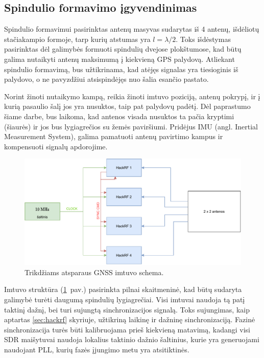 \documentclass[main.tex]{subfiles}
\begin{document}
\subsection{Spindulio formavimo įgyvendinimas}\label{sec:beamforming_concept}

Spindulio formavimui pasirinktas antenų masyvas sudarytas iš 4 antenų, išdėliotų
sta\-čia\-kam\-pio formoje, tarp kurių atstumas yra $l=\lambda / 2$. Toks
išdėstymas pasirinktas dėl galimybės formuoti spindulių dvejose plokštumose,
kad būtų galima nutaikyti antenų maksimumą į kiekvieną GPS palydovą.
Atliekant spindulio formavimą, bus užtikrinama, kad atėjęs signalas yra
tiesioginis iš palydovo, o ne pavyzdžiui atsispindėjęs nuo šalia esančio pastato.

Norint žinoti nutaikymo kampą, reikia žinoti imtuvo poziciją, antenų pokrypį,
ir į kurią pasaulio šalį jos yra nusuktos, taip pat palydovų padėtį.
Dėl paprastumo šiame darbe,
bus laikoma, kad antenos visada nusuktos ta pačia kryptimi (šiaurės)
ir jos bus lygiagrečios su žemės paviršiumi. Pridėjus IMU (angl. Inertial Measurement
System), galima pamatuoti antenų pavirtimo kampus ir kompensuoti signalų apdorojime.

\begin{figure}[h]
    \begin{centering}
    \includegraphics[scale=0.8]{drawings/beamformer_diagram}
    \par\end{centering}
    \protect\caption{\label{fig:gnss_beamform_block}Trikdžiams atsparaus GNSS imtuvo schema.}
\end{figure}

Imtuvo struktūra (\ref{fig:gnss_beamform_block}~pav.) pasirinkta pilnai skaitmeninė,
kad būtų sudaryta galimybė turėti daugumą
spindulių lygiagrečiai. Visi imtuvai naudoja tą patį taktinį dažnį, bei turi sujungtą
sinchronizacijos signalą. Toks sujungimas, kaip aptartas \ref{sec:hackrf} skyriuje,
užtikriną laikinę ir dažninę sinchronizaciją. Fazinė sinchronizacija turės būti
kalibruojama prieš kiekvieną matavimą, kadangi visi SDR maišytuvai naudoja lokalius
taktinio dažnio šaltinius, kurie yra generuojami naudojant PLL, kurių fazės
įjungimo metu yra atsitiktinės.
\end{document}
